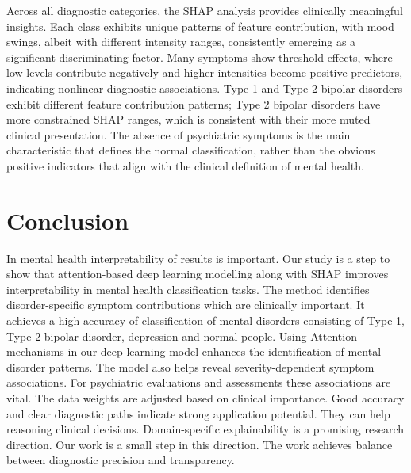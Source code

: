 \documentclass{article}
\begin{document}
Across all diagnostic categories, the SHAP analysis provides clinically meaningful insights. Each class exhibits unique patterns of feature contribution, with mood swings, albeit with different intensity ranges, consistently emerging as a significant discriminating factor. Many symptoms show threshold effects, where low levels contribute negatively and higher intensities become positive predictors, indicating nonlinear diagnostic associations. Type 1 and Type 2 bipolar disorders exhibit different feature contribution patterns; Type 2 bipolar disorders have more constrained SHAP ranges, which is consistent with their more muted clinical presentation. The absence of psychiatric symptoms is the main characteristic that defines the normal classification, rather than the obvious positive indicators that align with the clinical definition of mental health.

\section{Conclusion}

In mental health interpretability of results is important. Our study is a step to show that attention-based deep learning modelling along with SHAP improves interpretability in mental health classification tasks. The method identifies disorder-specific symptom contributions which are clinically important. It achieves a high accuracy of classification of mental disorders consisting of Type 1, Type 2 bipolar disorder, depression and normal people. Using Attention mechanisms in our deep learning model enhances the identification of mental disorder patterns. The model also helps reveal severity-dependent symptom associations. For psychiatric evaluations and assessments these associations are vital. The data weights are adjusted based on clinical importance. Good accuracy and clear diagnostic paths indicate strong application potential. They can help reasoning clinical decisions. Domain-specific explainability is a promising research direction. Our work is a small step in this direction. The work achieves balance between diagnostic precision and transparency.
\end{document}
